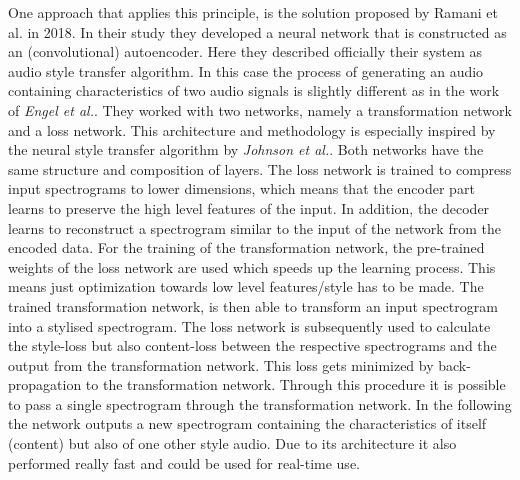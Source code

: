 One approach that applies this principle, is the solution proposed by Ramani et al. in 2018. \cite{Ramani2018} In their study they developed a neural network that is constructed as an (convolutional) autoencoder. Here they described officially their system as audio style transfer algorithm. In this case the process of generating an audio containing characteristics of two audio signals is slightly different as in the work of \textit{Engel et al.}. They worked with two networks, namely a transformation network and a loss network. This architecture and methodology is especially inspired by the neural style transfer algorithm by \textit{Johnson et al.}. Both networks have the same structure and composition of layers. The loss network is trained to compress input spectrograms to lower dimensions, which means that the encoder part learns to preserve the high level features of the input. In addition, the decoder learns to reconstruct a spectrogram similar to the input of the network from the encoded data. For the training of the transformation network, the pre-trained weights of the loss network are used which speeds up the learning process. This means just optimization towards low level features/style has to be made. The trained transformation network, is then able to transform an input spectrogram into a stylised spectrogram. The loss network is subsequently used to calculate the style-loss but also content-loss between the respective spectrograms and the output from the transformation network. This loss gets minimized by back- propagation to the transformation network. Through this procedure it is possible to pass a single spectrogram through the transformation network. In the following the network outputs a new spectrogram containing the characteristics of itself (content) but also of one other style audio. Due to its architecture it also performed really fast and could be used for real-time use.\\


